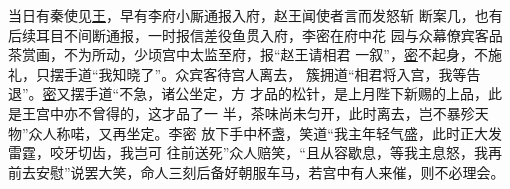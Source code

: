 \documentclass[UTF8]{ctexart}
\begin{document}
当日有秦使见\uline{王}，早有李府小厮通报入府，赵王闻使者言而发怒斩 断案几，也有后续耳目不间断通报，一时报信差役鱼贯入府，李密在府中花 园与众幕僚宾客品茶赏画，不为所动，少顷宫中太监至府，报“赵王请相君 一叙”，\uline{密}不起身，不施礼，只摆手道“我知晓了”。众宾客待宫人离去， 簇拥道“相君将入宫，我等告退”。\uline{密}又摆手道“不急，诸公坐定，方 才品的松针，是上月陛下新赐的上品，此是王宫中亦不曾得的，这才品了一 半，茶味尚未匀开，此时离去，岂不暴殄天物”众人称喏，又再坐定。李密 放下手中杯盏，笑道“我主年轻气盛，此时正大发雷霆，咬牙切齿，我岂可 往前送死”众人赔笑，“且从容歇息，等我主息怒，我再前去安慰”说罢大笑，命人三刻后备好朝服车马，若宫中有人来催，则不必理会。
\end{document}
